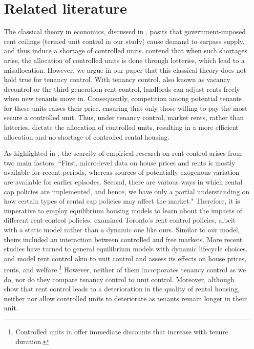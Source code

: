 \documentclass[parskip=full]{article}
\begin{document}
\section{Related literature}\label{sec:related_lit}

The classical theory in economics, discussed in \citet{suen-1989}, posits that government-imposed rent ceilings (termed unit control in our study) cause demand to surpass supply, and thus induce a shortage of controlled units. \citet{gl-2003} contend that when such shortages arise, the allocation of controlled units is done through lotteries, which lead to a misallocation. However, we argue in our paper that this classical theory does not hold true for tenancy control. With tenancy control, also known as vacancy decontrol or the third generation rent control, landlords can adjust rents freely when new tenants move in. Consequently, competition among potential tenants for these units raises their price, ensuring that only those willing to pay the most secure a controlled unit. Thus, under tenancy control, market rents, rather than lotteries, dictate the allocation of controlled units, resulting in a more efficient allocation and no shortage of controlled rental housing.

As highlighted in \citet{mm-2023}, the scarcity of empirical research on rent control arises from two main factors: ``First, micro-level data on house prices and rents is mostly available for recent periods, whereas sources of potentially exogenous variation are available for earlier episodes. Second, there are various ways in which rental cap policies are implemented, and hence, we have only a partial understanding on how certain types of rental cap policies may affect the market." Therefore, it is imperative to employ equilibrium housing models to learn about the impacts of different rent control policies. \citet{fallis-1985} examined Toronto's rent control policies, albeit with a static model rather than a dynamic one like ours. Similar to our model, theirs included an interaction between controlled and free markets. More recent studies have turned to general equilibrium models with dynamic lifecycle choices. \citet{eric-1995} and \citet{fmn-2023} model rent control akin to unit control and assess its effects on house prices, rents, and welfare.\footnote{Controlled units in \citet{fmn-2023} offer immediate discounts that increase with tenure duration.} However, neither of them incorporates tenancy control as we do, nor do they compare tenancy control to unit control. Moreover, although \citet{ms-1993} show that rent control leads to a deterioration in the quality of rental housing, neither \citet{eric-1995} nor \citet{fmn-2023} allow controlled units to deteriorate as tenants remain longer in their unit.
\end{document}

